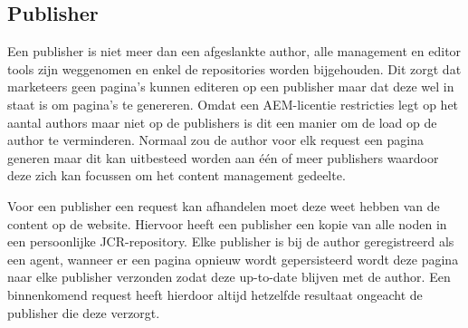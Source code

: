\documentclass{article}
\begin{document}
	\subsection{Publisher}
	Een publisher is niet meer dan een afgeslankte author, alle management en editor tools zijn weggenomen en enkel de repositories worden bijgehouden. Dit zorgt dat marketeers geen pagina's kunnen editeren op een publisher maar dat deze wel in staat is om pagina's te genereren. Omdat een AEM-licentie restricties legt op het aantal authors maar niet op de publishers is dit een manier om de load op de author te verminderen. Normaal zou de author voor elk request een pagina generen maar dit kan uitbesteed worden aan \'e\'en of meer publishers waardoor deze zich kan focussen om het content management gedeelte.
	\par
	Voor een publisher een request kan afhandelen moet deze weet hebben van de content op de website. Hiervoor heeft een publisher een kopie van alle noden in een persoonlijke JCR-repository. Elke publisher is bij de author geregistreerd als een agent, wanneer er een pagina opnieuw wordt gepersisteerd wordt deze pagina naar elke publisher verzonden zodat deze up-to-date blijven met de author. Een binnenkomend request heeft hierdoor altijd hetzelfde resultaat ongeacht de publisher die deze verzorgt.
\end{document}
